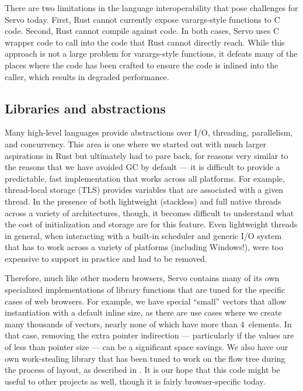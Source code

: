There are two limitations in the language interoperability that pose challenges for Servo today.
First, Rust cannot currently expose varargs-style functions to C code.
Second, Rust cannot compile against \Cplusplus{} code.
In both cases, Servo uses C wrapper code to call into the code that Rust cannot directly
reach.
While this approach is not a large problem for varargs-style functions, it defeats many of the
places where the \Cplusplus{} code has been crafted to ensure the code is inlined into the caller,
which results in degraded performance.

\subsection{Libraries and abstractions}
Many high-level languages provide abstractions over I/O, threading, parallelism, and concurrency.
This area is one where we started out with much larger aspirations in Rust but ultimately had to pare back,
for reasons very similar to the reasons that we have avoided GC by default --- it is difficult to provide a
predictable, fast implementation that works across all platforms.
For example, thread-local storage (TLS) provides variables that are associated with a given thread.
In the presence of both lightweight (stackless) and full native threads across a variety of architectures, though,
it becomes difficult to understand what the cost of initialization and storage are for this feature.
Even lightweight threads in general, when interacting with a built-in scheduler and generic I/O system that
has to work across a variety of platforms (including Windows!), were too expensive to support in practice and
had to be removed.

Therefore, much like other modern browsers, Servo contains many of its own specialized implementations of
library functions that are tuned for the specific cases of web browsers.
For example, we have special ``small'' vectors that allow instantiation with a default inline size,
as there are use cases where we create many thousands of vectors, nearly none of which have more than 4~elements.
In that case, removing the extra pointer indirection --- particularly if the values are of less than pointer size ---
can be a significant space savings.
We also have our own work-stealing library that has been tuned to work on the flow tree during the process of layout,
as described in .
It is our hope that this code might be useful to other projects as well, though it is fairly browser-specific today.

